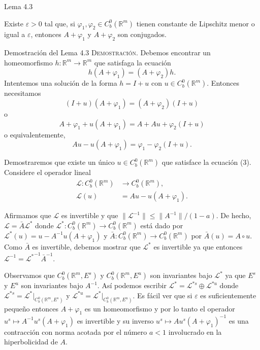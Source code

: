 \documentclass[10pt]{beamer}
\begin{document}
	\begin{frame}{Lema 4.3}
		\begin{lemma}[4.3]
			Existe $\varepsilon > 0$ tal que, si $\varphi_1, \varphi_2 \in C^0_b(\mathbb{R}^m)$ tienen constante de Lipschitz menor o igual a $\varepsilon$, entonces $A + \varphi_1$ y $A + \varphi_2$ son conjugados.
		\end{lemma}
	\end{frame}
	
	\begin{frame}[allowframebreaks]{Demostración del Lema 4.3}
		\textsc{Demostración.} Debemos encontrar un homeomorfismo $h: \mathbb{R}^m \to \mathbb{R}^m$ que satisfaga la ecuación
		\begin{equation}
			h(A + \varphi_1) = (A + \varphi_2)h.
		\end{equation}
		Intentemos una solución de la forma $h = I + u$ con $u \in C^0_b(\mathbb{R}^m)$. Entonces necesitamos
		\begin{equation}
			(I + u)(A + \varphi_1) = (A + \varphi_2)(I + u)
		\end{equation}
		o
		\[ A + \varphi_1 + u(A + \varphi_1) = A + Au + \varphi_2(I + u) \]
		o equivalentemente,
		\begin{equation}
			Au - u(A + \varphi_1) = \varphi_1 - \varphi_2(I + u).
		\end{equation}
		
		\framebreak
		
		Demostraremos que existe un único $u \in C^0_b(\mathbb{R}^m)$ que satisface la ecuación (3). Considere el operador lineal
		\begin{align*}
			\mathscr{L}: C^0_b(\mathbb{R}^m) &\to C^0_b(\mathbb{R}^m), \\
			\mathscr{L}(u) &= Au - u(A + \varphi_1).
		\end{align*}
		
		Afirmamos que $\mathscr{L}$ es invertible y que $\|\mathscr{L}^{-1}\| \le \|A^{-1}\|/(1 - a)$. De hecho, $\mathscr{L} = \bar{A}\mathscr{L}^*$ donde $\mathscr{L}^*: C^0_b(\mathbb{R}^m) \to C^0_b(\mathbb{R}^m)$ está dado por $\mathscr{L}^*(u) = u - A^{-1}u(A + \varphi_1)$ y $\bar{A}: C^0_b(\mathbb{R}^m) \to C^0_b(\mathbb{R}^m)$ por $\bar{A}(u) = A \circ u$. Como $\bar{A}$ es invertible, debemos mostrar que $\mathscr{L}^*$ es invertible ya que entonces $\mathscr{L}^{-1} = {\mathscr{L}^*}^{-1}\bar{A}^{-1}$. 
		
		\framebreak
		
		Observamos que $C^0_b(\mathbb{R}^m, E^s)$ y $C^0_b(\mathbb{R}^m, E^u)$ son invariantes bajo $\mathscr{L}^*$ ya que $E^s$ y $E^u$ son invariantes bajo $A^{-1}$. Así podemos escribir $\mathscr{L}^* = \mathscr{L}^{*s} \oplus \mathscr{L}^{*u}$ donde $\mathscr{L}^{*s} = \mathscr{L}^*|_{C^0_b(\mathbb{R}^m, E^s)}$ y $\mathscr{L}^{*u} = \mathscr{L}^*|_{C^0_b(\mathbb{R}^m, E^u)}$. Es fácil ver que si $\varepsilon$ es suficientemente pequeño entonces $A + \varphi_1$ es un homeomorfismo y por lo tanto el operador $u^s \mapsto A^{-1}u^s(A + \varphi_1)$ es invertible y su inverso $u^s \mapsto Au^s(A + \varphi_1)^{-1}$ es una contracción con norma acotada por el número $a < 1$ involucrado en la hiperbolicidad de $A$. 
		

\end{frame}
\end{document}
